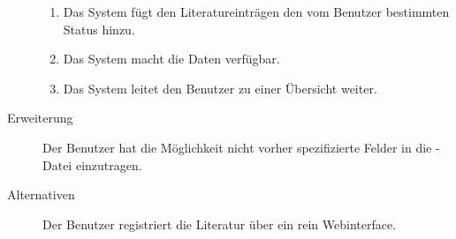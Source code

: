 \begin{description}
\begin{enumerate}
      \item Das System fügt den Literatureinträgen den vom Benutzer bestimmten Status hinzu.
      \item Das System macht die Daten verfügbar.
      \item Das System leitet den Benutzer zu einer Übersicht weiter.
    \end{enumerate}
  \item[Erweiterung]Der Benutzer hat die Möglichkeit nicht vorher spezifizierte Felder in die \BibTeX -Datei einzutragen.
  \item[Alternativen]Der Benutzer registriert die Literatur über ein rein Webinterface.
\end{description}

